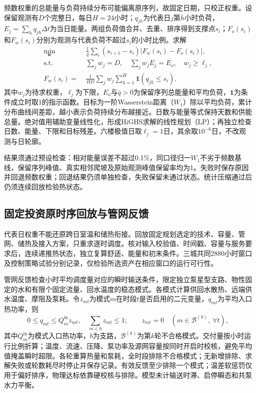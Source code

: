 频数权重的总能量与负荷持续分布可能偏离原序列，故固定日期，只校正权重。设保留观测有$D$个完整日，每日$H=24$小时；$q_{jh}$为代表日$j$第$h$小时负荷，$E_j=\sum_hq_{jh}\Delta t$为当日能量。两组负荷值合并、去重、排序得到支撑点$s_i$；$F_o(s_i)$和$F_w(s_i)$分别为观测与代表负荷不超过$s_i$的小时比例。求解
\begin{equation}
\begin{aligned}
\min_{\boldsymbol w}\;&\frac{1}{\bar q}\sum_i(s_{i+1}-s_i)
       |F_w(s_i)-F_o(s_i)|,\\
\text{s.t.}\;&\sum_jw_j=D,\quad \sum_jw_jE_j=E_o,\quad w_j\geq\ell_j,\\
F_w(s_i)=\;&\frac{1}{HD}\sum_jw_j\sum_{h=1}^{H}\mathbf1(q_{jh}\leq s_i).
\end{aligned}
\label{eq:scoring-hard-w1}
\end{equation}
其中$w_j$为待求权重，$\ell_j$为下限，$E_o$与$\bar q>0$为保留序列总能量和平均负荷，$\mathbf1$为条件成立时取1的指示函数。目标为一阶Wasserstein距离（$W_1$）除以平均负荷，累计分布曲线间差距，越小表示负荷持续分布越接近。日数与能量等式保持天数和供能总量。绝对值用辅助变量线性化，形成HiGHS求解的线性规划（LP）；再独立检查日数、能量、下限和目标残差。六楼极值日取$\ell_j=1$日，其余取$10^{-6}$日，不改观测与日轮廓。

结果须通过预设检查：相对能量误差不超过0.1\%，同口径归一$W_1$不劣于频数基线，保留序列峰值、真实相邻爬坡及原始观测峰值保留率均为1。失败时保存原因并回退频数权重；回退结果仍须单独检查，失败保留未通过状态。统计压缩通过后仍须连续回放检验热状态。

\subsection{固定投资原时序回放与管网反馈}

代表日权重不能还原跨日室温和储热衔接。回放固定规划选定的技术、容量、管网、储热及接入方案，只重求逐时调度。核对输入校验值、时间戳、容量与服务要求后，连续递推热状态，独立复算舒适、能量和初末条件。三城共同2880小时窗口及控制策略试验分别记录，仅检验所选资产在相应窗口的运行可行性。

管网反馈检查小时平均调度量对应的瞬时输送条件，限定独立泵星型支路、物性固定的水和有限个固定流量、回水温度的稳态模式。各模式计算供回水散热、远端供水温度、摩阻及泵耗。令$z_{mt}$为模式$m$在时段$t$是否启用的二元变量，$q_{mt}$为平均入口热功率，则
\begin{equation}
0\leq q_{mt}\leq Q_m^{\mathrm{in}}z_{mt},\quad
\sum_{m\in b}z_{mt}\leq1;
\qquad z_{mt}=0\quad(m\in\mathcal B^{(k)},\ \forall t),
\label{eq:scoring-network-cut}
\end{equation}
其中$Q_m^{\mathrm{in}}$为模式入口热功率，$b$为支路，$\mathcal B^{(k)}$为第$k$轮不合格模式。交付量按小时运行比例折算；温度、流速、压降、泵功率及源网容量按同时开启时校核，避免平均值掩盖瞬时超限。各轮重算热量和泵耗，全时段排除不合格模式；无新增排除、求解失败或轮数耗尽时停止并保存记录。有效反馈至少排除一个模式；温差软惩罚仅用于偏好排序，物理达标依靠硬校核与排除。模型未计输送时滞、启停瞬态和共泵水力平衡。

